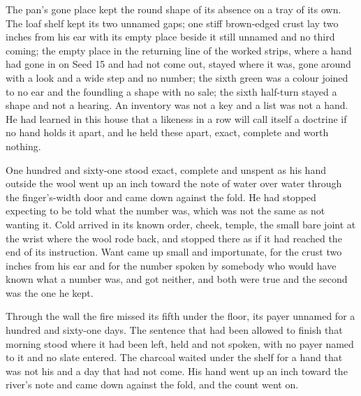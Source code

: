 The pan's gone place kept the round shape of its absence on a tray of its own. The loaf shelf kept its two unnamed gaps; one stiff brown-edged crust lay two inches from his ear with its empty place beside it still unnamed and no third coming; the empty place in the returning line of the worked strips, where a hand had gone in on Seed 15 and had not come out, stayed where it was, gone around with a look and a wide step and no number; the sixth green was a colour joined to no ear and the foundling a shape with no sale; the sixth half-turn stayed a shape and not a hearing. An inventory was not a key and a list was not a hand. He had learned in this house that a likeness in a row will call itself a doctrine if no hand holds it apart, and he held these apart, exact, complete and worth nothing.

One hundred and sixty-one stood exact, complete and unspent as his hand outside the wool went up an inch toward the note of water over water through the finger's-width door and came down against the fold. He had stopped expecting to be told what the number was, which was not the same as not wanting it. Cold arrived in its known order, cheek, temple, the small bare joint at the wrist where the wool rode back, and stopped there as if it had reached the end of its instruction. Want came up small and importunate, for the crust two inches from his ear and for the number spoken by somebody who would have known what a number was, and got neither, and both were true and the second was the one he kept.

Through the wall the fire missed its fifth under the floor, its payer unnamed for a hundred and sixty-one days. The sentence that had been allowed to finish that morning stood where it had been left, held and not spoken, with no payer named to it and no slate entered. The charcoal waited under the shelf for a hand that was not his and a day that had not come. His hand went up an inch toward the river's note and came down against the fold, and the count went on.
